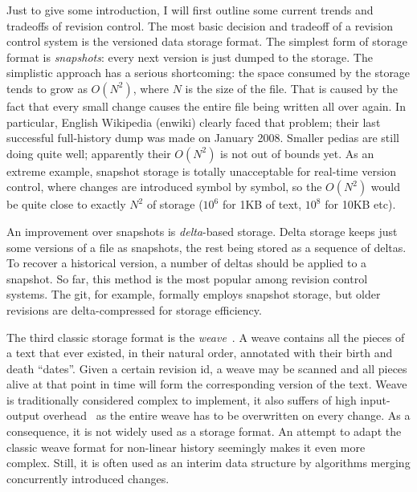 \documentclass{acm_proc_article-sp}
\begin{document}
Just to give some introduction, I will first outline some current
trends and tradeoffs of revision control. The most
basic decision and tradeoff of a revision control system
is the versioned data
storage format. The simplest form of storage format is \emph{snapshots}:
every next version is just dumped to the storage. The simplistic
approach has a serious shortcoming: the space consumed by the storage
tends to grow as $O(N^2)$, where $N$ is the size of the file.
That is caused by the fact that every small change causes the
entire file being written all over again. In particular, English
Wikipedia (enwiki) clearly faced that problem; their last successful
full-history dump was made on January 2008. Smaller pedias are
still doing quite well; apparently their $O(N^2)$ is not
out of bounds yet.
As an extreme example, snapshot storage is totally
unacceptable for real-time version control, where changes
are introduced symbol by symbol, so the $O(N^2)$ would be quite
close to exactly $N^2$ of storage ($10^{6}$ for 1KB of text,
$10^{8}$ for 10KB etc).

An improvement over snapshots is \emph{delta}-based storage. 
Delta storage keeps just some versions of a file as snapshots,
the rest being stored as a sequence of deltas. To recover a
historical version, a number of deltas should be applied
to a snapshot. 
So far, this method is the most popular among revision control
systems. The git, for example, formally employs
snapshot storage, but older revisions are delta-compressed
for storage efficiency. 

The third classic storage format is the 
\emph{weave}~\cite{rcs-txt,revctrl-weave}. 
A weave contains all the pieces of a text that ever existed,
in their natural order, annotated with their birth and
death ``dates''. Given a certain revision id, a weave may be
scanned and all pieces alive at that point in time will form the
corresponding version of the text. Weave is traditionally
considered complex to implement, it also suffers of high 
input-output overhead~\cite{bazaar-weave} as the entire
weave has to be overwritten on every change. As a consequence, 
it is not widely used as a storage format.
An attempt to adapt the classic weave format for non-linear
history seemingly makes it even more complex.
Still, it is often used as an interim data structure by
algorithms merging concurrently introduced changes.

\newcommand{\aum}{{\fontspec{Devanagari MT}\selectfont ॐ}}
\newcommand{\eoa}{{\fontspec{Geeza Pro}\selectfont ۝}}
\newcommand{\bsp}{{\fontspec{Apple Symbols} ⌫}}
\newcommand{\cnc}{{\fontspec{Apple Symbols} ⌦}}
\newcommand{\zero}{{\fontspec{Apple Symbols} ⌀}}
\end{document}
